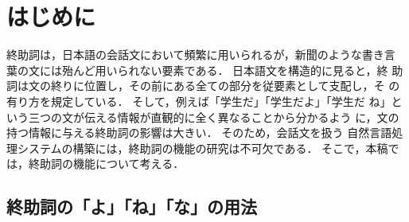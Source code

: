 
\makeatletter
{}
\def\enumsentence{}
\long{}
\makeatother

\newcommand{\res}[1]{}
\newcommand{\rep}[1]{}
\newcommand{\red}[1]{}

\newtheorem{obserb}{}
\newcommand{\reobs}[1]{}


\maketitle
\section{はじめに} \label{haji}
終助詞は，日本語の会話文において頻繁に用いられるが，新聞のような書き言
葉の文には殆んど用いられない要素である．  日本語文を構造的に見ると，終
助詞は文の終りに位置し，その前にある全ての部分を従要素として支配し，そ
の有り方を規定している．  そして，例えば「学生だ」「学生だよ」「学生だ
ね」という三つの文が伝える情報が直観的に全く異なることから分かるよう
に，文の持つ情報に与える終助詞の影響は大きい．  そのため，会話文を扱う
自然言語処理システムの構築には，終助詞の機能の研究は不可欠である．
そこで，本稿では，終助詞の機能について考える．

\subsection{終助詞の「よ」「ね」「な」の用法}

